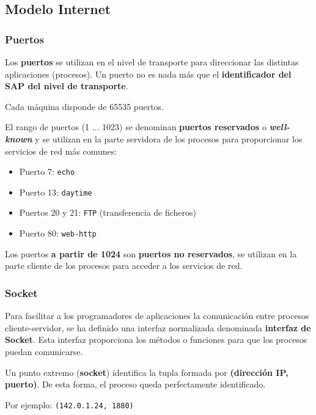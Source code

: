 \documentclass[a4paper]{book}
\numberwithin{figure}{chapter}
\numberwithin{equation}{subsection}
\begin{document}
\subsection{Modelo Internet}
\subsubsection{Puertos}
Los \textbf{puertos} se utilizan en el nivel de transporte para direccionar las distintas aplicaciones (procesos). Un puerto no es nada más que el \textbf{identificador del SAP del nivel de transporte}.

Cada máquina disponde de 65535 puertos.

El rango de puertos (1 ... 1023) se denominan \textbf{puertos reservados} o \textbf{\textsl{well-known}} y se utilizan en la parte servidora de los procesos para proporcionar los servicios de red más comunes:
\setlength{\columnsep}{-5cm}
\begin{multicols}{2}
  \begin{itemize}
    \item Puerto 7: \verb!echo!
    \item Puerto 13: \verb!daytime!
    \item Puertos 20 y 21: \verb!FTP! (transferencia de ficheros)
    \item Puerto 80: \verb!web-http!
  \end{itemize}
\end{multicols}

Los puertos \textbf{a partir de 1024} son \textbf{puertos no reservados}, se utilizan en la parte cliente de los procesos para acceder a los servicios de red.

\subsubsection{Socket}
Para facilitar a los programadores de aplicaciones la comunicación entre procesos cliente-servidor, se ha definido una interfaz normalizada denominada \textbf{interfaz de Socket}. Esta interfaz proporciona los métodos o funciones para que los procesos puedan comunicarse.

Un punto extremo (\textbf{socket}) identifica la tupla formada por \textbf{(dirección IP, puerto)}. De esta forma, el proceso queda perfectamente identificado.

Por ejemplo: \verb!(142.0.1.24, 1880)!
\end{document}
